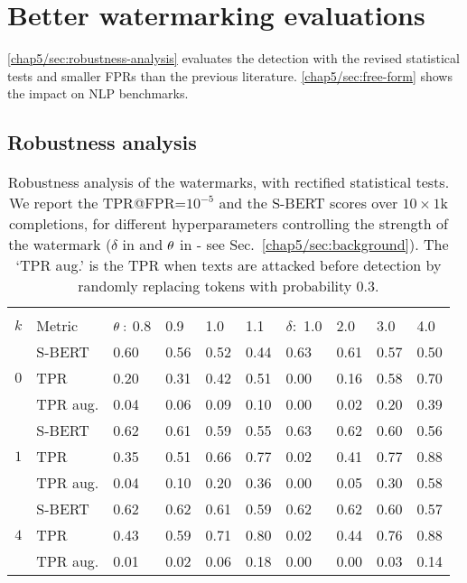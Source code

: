 
\section{Better watermarking evaluations}

\autoref{chap5/sec:robustness-analysis} evaluates the detection with the revised statistical tests and smaller FPRs than the previous literature. 
\autoref{chap5/sec:free-form} shows the impact on NLP benchmarks.

\subsection{Robustness analysis}
\label{chap5/sec:robustness-analysis}

\begin{table}[t!]
    \centering
    \caption{
    Robustness analysis of the watermarks, with rectified statistical tests.
    We report the TPR@FPR=$10^{-5}$ and the S-BERT scores over $10\times 1$k completions, for different hyperparameters controlling the strength of the watermark 
    ($\delta$ in \citep{kirchenbauer2023watermark} and $\theta$ in \citep{aaronson2023watermarking} - see Sec.~\ref{chap5/sec:background}).
    The `TPR aug.' is the TPR when texts are attacked before detection by randomly replacing tokens with probability 0.3.
    }
    \label{chap5/tab:robustness}
    \footnotesize
    \begin{tabular}{rl *{4}{p{1cm}} @{\hspace{0.5cm}} *{4}{p{1cm}}}
        \toprule
        & & \multicolumn{4}{c}{\citep{aaronson2023watermarking}} &  \multicolumn{4}{c}{\citep{kirchenbauer2023watermark}}  \\
        $k$ & Metric & $\theta:$ 0.8 & 0.9 & 1.0 & 1.1 & $\delta:$ 1.0 & 2.0 & 3.0 & 4.0 \\
        \cmidrule(rr){3-6} \cmidrule(rr){7-10}
        \multirow{3}{*}{$0$} 
            & S-BERT    & 0.60 & 0.56 & 0.52 & 0.44 & 0.63 & 0.61 & 0.57 & 0.50 \\
            & TPR       & 0.20 & 0.31 & 0.42 & 0.51 & 0.00 & 0.16 & 0.58 & 0.70 \\
            & TPR aug.  & 0.04 & 0.06 & 0.09 & 0.10 & 0.00 & 0.02 & 0.20 & 0.39 \\[4pt]
        \multirow{3}{*}{$1$} 
            & S-BERT    & 0.62 & 0.61 & 0.59 & 0.55 & 0.63 & 0.62 & 0.60 & 0.56 \\
            & TPR       & 0.35 & 0.51 & 0.66 & 0.77 & 0.02 & 0.41 & 0.77 & 0.88 \\
            & TPR aug.  & 0.04 & 0.10 & 0.20 & 0.36 & 0.00 & 0.05 & 0.30 & 0.58 \\[4pt]
        \multirow{3}{*}{$4$} 
            & S-BERT    & 0.62 & 0.62 & 0.61 & 0.59 & 0.62 & 0.62 & 0.60 & 0.57 \\
            & TPR       & 0.43 & 0.59 & 0.71 & 0.80 & 0.02 & 0.44 & 0.76 & 0.88 \\
            & TPR aug.  & 0.01 & 0.02 & 0.06 & 0.18 & 0.00 & 0.00 & 0.03 & 0.14 \\
        \bottomrule
    \end{tabular}
\end{table}   
